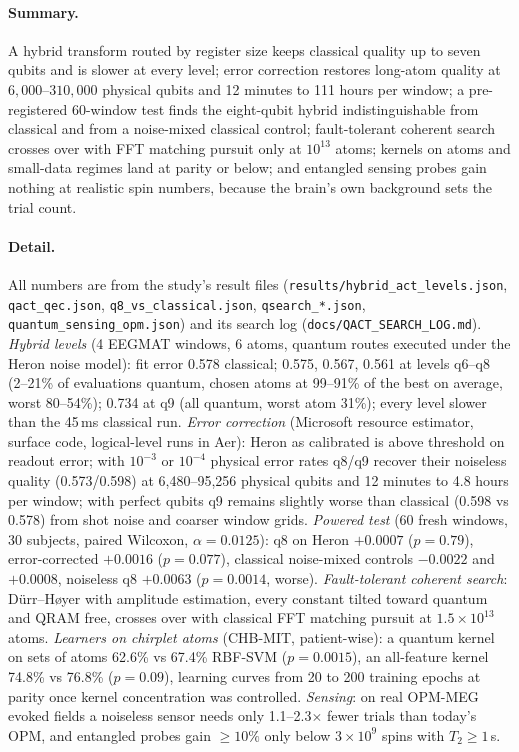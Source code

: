 \documentclass{article}
\begin{document}
\paragraph{Summary.} A hybrid transform routed by register size keeps classical quality up to seven qubits and is slower at every level; error correction restores long-atom quality at $6{,}000$--$310{,}000$ physical qubits and 12 minutes to 111 hours per window; a pre-registered 60-window test finds the eight-qubit hybrid indistinguishable from classical and from a noise-mixed classical control; fault-tolerant coherent search crosses over with FFT matching pursuit only at $10^{13}$ atoms; kernels on atoms and small-data regimes land at parity or below; and entangled sensing probes gain nothing at realistic spin numbers, because the brain's own background sets the trial count.

\paragraph{Detail.} All numbers are from the study's result files (\texttt{results/hybrid\_act\_levels.json}, \texttt{qact\_qec.json}, \texttt{q8\_vs\_classical.json}, \texttt{qsearch\_*.json}, \texttt{quantum\_sensing\_opm.json}) and its search log (\texttt{docs/QACT\_SEARCH\_LOG.md}). \emph{Hybrid levels} (4 EEGMAT windows, 6 atoms, quantum routes executed under the Heron noise model): fit error 0.578 classical; 0.575, 0.567, 0.561 at levels q6--q8 (2--21\% of evaluations quantum, chosen atoms at 99--91\% of the best on average, worst 80--54\%); 0.734 at q9 (all quantum, worst atom 31\%); every level slower than the 45\,ms classical run. \emph{Error correction} (Microsoft resource estimator, surface code, logical-level runs in Aer): Heron as calibrated is above threshold on readout error; with $10^{-3}$ or $10^{-4}$ physical error rates q8/q9 recover their noiseless quality (0.573/0.598) at 6,480--95,256 physical qubits and 12 minutes to 4.8 hours per window; with perfect qubits q9 remains slightly worse than classical (0.598 vs 0.578) from shot noise and coarser window grids. \emph{Powered test} (60 fresh windows, 30 subjects, paired Wilcoxon, $\alpha=0.0125$): q8 on Heron $+0.0007$ ($p=0.79$), error-corrected $+0.0016$ ($p=0.077$), classical noise-mixed controls $-0.0022$ and $+0.0008$, noiseless q8 $+0.0063$ ($p=0.0014$, worse). \emph{Fault-tolerant coherent search}: Dürr--Høyer with amplitude estimation, every constant tilted toward quantum and QRAM free, crosses over with classical FFT matching pursuit at $1.5\times10^{13}$ atoms. \emph{Learners on chirplet atoms} (CHB-MIT, patient-wise): a quantum kernel on sets of atoms 62.6\% vs 67.4\% RBF-SVM ($p=0.0015$), an all-feature kernel 74.8\% vs 76.8\% ($p=0.09$), learning curves from 20 to 200 training epochs at parity once kernel concentration was controlled. \emph{Sensing}: on real OPM-MEG evoked fields a noiseless sensor needs only 1.1--2.3$\times$ fewer trials than today's OPM, and entangled probes gain $\ge10\%$ only below $3\times10^{9}$ spins with $T_2\ge1$\,s.
\end{document}
